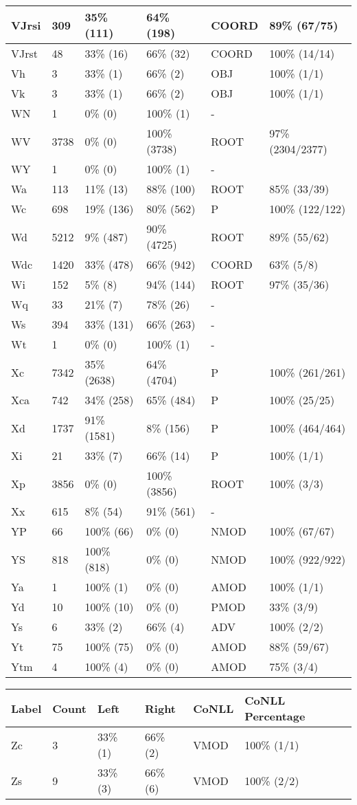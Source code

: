 \begin{figure*}
\begin{tabular}{|l|l|l|l||l|l|}
\hline
 VJrsi & 309 & 35\% (111) & 64\% (198) & COORD & 89\% (67/75) \\ 
\hline
 VJrst & 48 & 33\% (16) & 66\% (32) & COORD & 100\% (14/14) \\ 
\hline
 Vh & 3 & 33\% (1) & 66\% (2) & OBJ & 100\% (1/1) \\ 
\hline
 Vk & 3 & 33\% (1) & 66\% (2) & OBJ & 100\% (1/1) \\ 
\hline
 WN & 1 & 0\% (0) & 100\% (1) & - &  \\ 
\hline
 WV & 3738 & 0\% (0) & 100\% (3738) & ROOT & 97\% (2304/2377) \\ 
\hline
 WY & 1 & 0\% (0) & 100\% (1) & - &  \\ 
\hline
 Wa & 113 & 11\% (13) & 88\% (100) & ROOT & 85\% (33/39) \\ 
\hline
 Wc & 698 & 19\% (136) & 80\% (562) & P & 100\% (122/122) \\ 
\hline
 Wd & 5212 & 9\% (487) & 90\% (4725) & ROOT & 89\% (55/62) \\ 
\hline
 Wdc & 1420 & 33\% (478) & 66\% (942) & COORD & 63\% (5/8) \\ 
\hline
 Wi & 152 & 5\% (8) & 94\% (144) & ROOT & 97\% (35/36) \\ 
\hline
 Wq & 33 & 21\% (7) & 78\% (26) & - &  \\ 
\hline
 Ws & 394 & 33\% (131) & 66\% (263) & - &  \\ 
\hline
 Wt & 1 & 0\% (0) & 100\% (1) & - &  \\ 
\hline
 Xc & 7342 & 35\% (2638) & 64\% (4704) & P & 100\% (261/261) \\ 
\hline
 Xca & 742 & 34\% (258) & 65\% (484) & P & 100\% (25/25) \\ 
\hline
 Xd & 1737 & 91\% (1581) & 8\% (156) & P & 100\% (464/464) \\ 
\hline
 Xi & 21 & 33\% (7) & 66\% (14) & P & 100\% (1/1) \\ 
\hline
 Xp & 3856 & 0\% (0) & 100\% (3856) & ROOT & 100\% (3/3) \\ 
\hline
 Xx & 615 & 8\% (54) & 91\% (561) & - &  \\ 
\hline
 YP & 66 & 100\% (66) & 0\% (0) & NMOD & 100\% (67/67) \\ 
\hline
 YS & 818 & 100\% (818) & 0\% (0) & NMOD & 100\% (922/922) \\ 
\hline
 Ya & 1 & 100\% (1) & 0\% (0) & AMOD & 100\% (1/1) \\ 
\hline
 Yd & 10 & 100\% (10) & 0\% (0) & PMOD & 33\% (3/9) \\ 
\hline
 Ys & 6 & 33\% (2) & 66\% (4) & ADV & 100\% (2/2) \\ 
\hline
 Yt & 75 & 100\% (75) & 0\% (0) & AMOD & 88\% (59/67) \\ 
\hline
 Ytm & 4 & 100\% (4) & 0\% (0) & AMOD & 75\% (3/4) \\ 
\hline
\end{tabular}
\end{figure*}
\begin{figure*}
\begin{tabular}{|l|l|l|l||l|l|}
\hline
Label & Count & Left & Right & CoNLL & CoNLL Percentage\\ 
\hline
 Zc & 3 & 33\% (1) & 66\% (2) & VMOD & 100\% (1/1) \\ 
\hline
 Zs & 9 & 33\% (3) & 66\% (6) & VMOD & 100\% (2/2) \\ 
\hline
\end{tabular}
\end{figure*}
